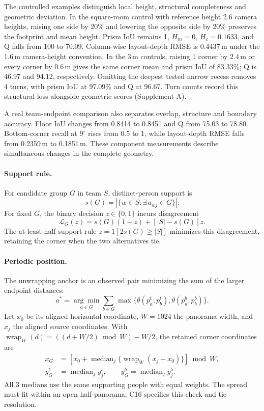 The controlled examples distinguish local height, structural completeness and geometric deviation. In the square-room control with reference height 2.6 camera heights, raising one side by 20\% and lowering the opposite side by 20\% preserves the footprint and mean height. Prism IoU remains 1, \(H_m=0\), \(H_c=0.1633\), and Q falls from 100 to 70.09. Column-wise layout-depth RMSE is 0.4437\,m under the 1.6\,m camera-height convention. In the 3\,m controls, raising 1 corner by 2.4\,m or every corner by 0.6\,m gives the same corner mean and prism IoU of 83.33\%; Q is 46.97 and 94.12, respectively. Omitting the deepest tested narrow recess removes 4 turns, with prism IoU at 97.09\% and Q at 96.67. Turn counts record this structural loss alongside geometric scores (Supplement A).

A real team-endpoint comparison also separates overlap, structure and boundary accuracy. Floor IoU changes from 0.8414 to 0.8451 and Q from 75.03 to 78.80. Bottom-corner recall at \(9^\circ\) rises from 0.5 to 1, while layout-depth RMSE falls from 0.2359\,m to 0.1851\,m. These component measurements describe simultaneous changes in the complete geometry.

\paragraph{Support rule.}
For candidate group \(G\) in team \(S\), distinct-person support is
\begin{equation}
 s(G)=|\{w\in S:\exists\,a_{wj}\in G\}|.
 \label{eq:supp-support}
\end{equation}
For fixed \(G\), the binary decision \(z\in\{0,1\}\) incurs disagreement
\begin{equation}
 \mathcal L_G(z)=s(G)(1-z)+[|S|-s(G)]z.
 \label{eq:supp-support-disagreement}
\end{equation}
The at-least-half support rule \(z=\mathrm{1}[2s(G)\geq|S|]\) minimizes this disagreement, retaining the corner when the two alternatives tie.

\paragraph{Periodic position.}
The unwrapping anchor is an observed pair minimizing the sum of the larger endpoint distances:
\begin{equation}
 a^*=\underset{a\in G}{\arg\min}\sum_{b\in G}
 \max\{\theta(p_a^t,p_b^t),\theta(p_a^b,p_b^b)\}.
 \label{eq:supp-position-anchor}
\end{equation}
Let \(x_0\) be its aligned horizontal coordinate, \(W=1024\) the panorama width, and \(x_j\) the aligned source coordinates. With \(\operatorname{wrap}_W(d)=((d+W/2)\bmod W)-W/2\), the retained corner coordinates are
\begin{align}
 x_G&=\left[x_0+\operatorname{median}_j\{\operatorname{wrap}_W(x_j-x_0)\}\right]\bmod W,\label{eq:supp-median-x}\\
 y_G^t&=\operatorname{median}_j y_j^t,\qquad y_G^b=\operatorname{median}_j y_j^b.\label{eq:supp-median-y}
\end{align}
All 3 medians use the same supporting people with equal weights. The spread must fit within an open half-panorama; C16 specifies this check and tie resolution.
